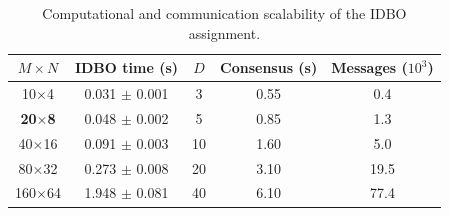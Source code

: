 \begin{table}[!t]
\centering
\small
\setlength{\tabcolsep}{3.5pt}
\caption{Computational and communication scalability of the IDBO assignment.}
\label{tab:idbo_assignment_scale}
\begin{tabular}{ccccc}
\hline\hline
$M\!\times\!N$ & IDBO time (s) & $D$ & Consensus (s) & Messages ($10^3$) \\
\hline
10$\times$4 & 0.031 $\pm$ 0.001 & 3 & 0.55 & 0.4 \\
\textbf{20$\times$8} & 0.048 $\pm$ 0.002 & 5 & 0.85 & 1.3 \\
40$\times$16 & 0.091 $\pm$ 0.003 & 10 & 1.60 & 5.0 \\
80$\times$32 & 0.273 $\pm$ 0.008 & 20 & 3.10 & 19.5 \\
160$\times$64 & 1.948 $\pm$ 0.081 & 40 & 6.10 & 77.4 \\
\hline
\end{tabular}
\end{table}
